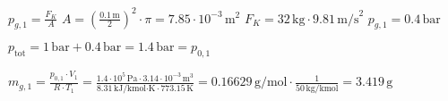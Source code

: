 \( p_{g,1} = \frac{F_K}{A} \)  
\( A = \left(\frac{0.1 \, \text{m}}{2}\right)^2 \cdot \pi = 7.85 \cdot 10^{-3} \, \text{m}^2 \)  
\( F_K = 32 \, \text{kg} \cdot 9.81 \, \text{m/s}^2 \)  
\( p_{g,1} = 0.4 \, \text{bar} \)  

\( p_{\text{tot}} = 1 \, \text{bar} + 0.4 \, \text{bar} = 1.4 \, \text{bar} = p_{0,1} \)  

\( m_{g,1} = \frac{p_{0,1} \cdot V_1}{R \cdot T_1} = \frac{1.4 \cdot 10^5 \, \text{Pa} \cdot 3.14 \cdot 10^{-3} \, \text{m}^3}{8.31 \, \text{kJ/kmol·K} \cdot 773.15 \, \text{K}} = 0.16629 \, \text{g/mol} \cdot \frac{1}{50 \, \text{kg/kmol}} = 3.419 \, \text{g} \)